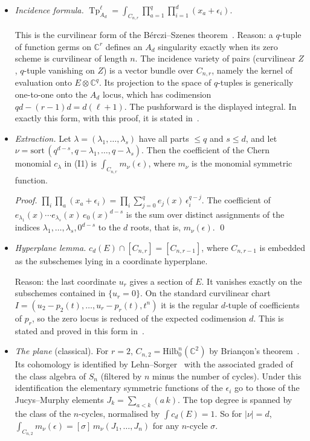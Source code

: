\documentclass[11pt,a4paper]{article}
\DeclareMathOperator{\Tp}{Tp}
\theoremstyle{plain}
\theoremstyle{definition}
\theoremstyle{remark}
\begin{document}
\begin{itemize}[leftmargin=3.2em]
\item[\textbf{(I1)}] \emph{Incidence formula.}
  $\displaystyle \Tp^\ell_{A_d} = \int_{C_{n,r}} \prod_{a=1}^{q} \prod_{i=1}^{d} (x_a + \epsilon_i)$.

  This is the curvilinear form of the B\'erczi--Szenes theorem~\cite{BS12}. Reason: a $q$-tuple
  of function germs on $\mathbb{C}^r$ defines an $A_d$ singularity exactly when its zero scheme is
  curvilinear of length $n$. The incidence variety of pairs (curvilinear $Z$, $q$-tuple vanishing on
  $Z$) is a vector bundle over $C_{n,r}$, namely the kernel of evaluation onto $E \otimes \mathbb{C}^q$.
  Its projection to the space of $q$-tuples is generically one-to-one onto the $A_d$ locus, which has
  codimension $qd - (r-1)d = d(\ell+1)$. The pushforward is the displayed integral. In exactly this
  form, with this proof, it is stated in~\cite{FS}.

\item[\textbf{(I2)}] \emph{Extraction.} Let $\lambda = (\lambda_1, \dots, \lambda_s)$ have all parts
  $\le q$ and $s \le d$, and let
  $\nu = \mathrm{sort}\,(q^{d-s}, q - \lambda_1, \dots, q - \lambda_s)$. Then the coefficient of the
  Chern monomial $c_\lambda$ in (I1) is $\int_{C_{n,r}} m_\nu(\epsilon)$, where $m_\nu$ is the
  monomial symmetric function.

  \emph{Proof.} $\prod_{i}\prod_{a} (x_a + \epsilon_i) = \prod_i \sum_{j=0}^{q} e_j(x)\,
  \epsilon_i^{q-j}$. The coefficient of $e_{\lambda_1}(x) \cdots e_{\lambda_s}(x)\, e_0(x)^{d-s}$ is the
  sum over distinct assignments of the indices $\lambda_1, \dots, \lambda_s, 0^{d-s}$ to the $d$ roots,
  that is, $m_\nu(\epsilon)$. \qed

\item[\textbf{(I3)}] \emph{Hyperplane lemma.} $c_d(E) \cap [C_{n,r}] = [C_{n,r-1}]$, where
  $C_{n,r-1}$ is embedded as the subschemes lying in a coordinate hyperplane.

  Reason: the last coordinate $u_r$ gives a section of $E$. It vanishes exactly on the subschemes
  contained in $\{u_r = 0\}$. On the standard curvilinear chart $I = (u_2 - p_2(t), \dots,
  u_r - p_r(t), t^n)$ it is the regular $d$-tuple of coefficients of $p_r$, so the zero locus is
  reduced of the expected codimension $d$. This is stated and proved in this form in~\cite{FS}.

\item[\textbf{(I4)}] \emph{The plane} (classical). For $r = 2$, $C_{n,2} = \mathrm{Hilb}^n_0(\mathbb{C}^2)$
  by Brian\c{c}on's theorem~\cite{Bri77}. Its cohomology is identified by Lehn--Sorger~\cite{LS01}
  with the associated graded of the class algebra of $S_n$ (filtered by $n$ minus the number of
  cycles). Under this identification the elementary symmetric functions of the $\epsilon_i$ go to
  those of the Jucys--Murphy elements $J_k = \sum_{a<k}(a\,k)$. The top degree is spanned by the
  class of the $n$-cycles, normalised by $\int c_d(E) = 1$. So for $|\nu| = d$,
  $\int_{C_{n,2}} m_\nu(\epsilon) = [\sigma]\, m_\nu(J_1, \dots, J_n)$ for any $n$-cycle $\sigma$.
\end{itemize}
\end{document}
